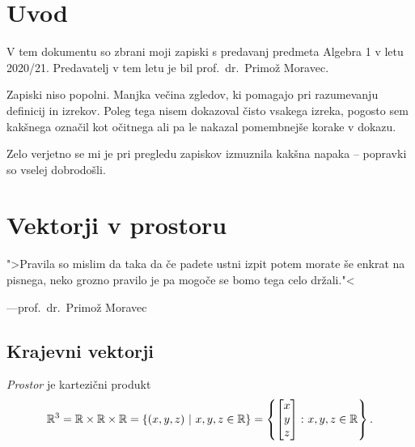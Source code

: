 \documentclass[12pt, a4paper]{article}
\begin{document}
\renewcommand{\headheight}{20pt}
\renewcommand{\arraystretch}{1}

\maketitle

\newpage

\tableofcontents

\newpage

\section*{Uvod}

V tem dokumentu so zbrani moji zapiski s predavanj predmeta Algebra 1 v letu 2020/21. Predavatelj v tem letu je bil prof.~dr.~Primož Moravec.

Zapiski niso popolni. Manjka večina zgledov, ki pomagajo pri razumevanju definicij in izrekov. Poleg tega nisem dokazoval čisto vsakega izreka, pogosto sem kakšnega označil kot očitnega ali pa le nakazal pomembnejše korake v dokazu.

Zelo verjetno se mi je pri pregledu zapiskov izmuznila kakšna napaka -- popravki so vselej dobrodošli.

\newpage

\section{Vektorji v prostoru}

\epigraph{">Pravila so mislim da taka da če padete ustni izpit potem morate še enkrat na pisnega, neko grozno pravilo je pa mogoče se bomo tega celo držali."<}{---prof.~dr.~Primož Moravec}

\subsection{Krajevni vektorji}

\begin{okvir}
\begin{definicija}
\emph{Prostor} je kartezični produkt
\[
\mathbb{R}^3=\mathbb{R}\times\mathbb{R}\times\mathbb{R}
=\left\{(x, y, z)~\middle\vert~x,y,z\in\mathbb{R}\right\}
=\left\{
\begin{bmatrix}
x \\
y \\
z
\end{bmatrix}
\colon x,y,z\in\mathbb{R}\right\}.
\]
\end{definicija}
\end{okvir}
\end{document}

